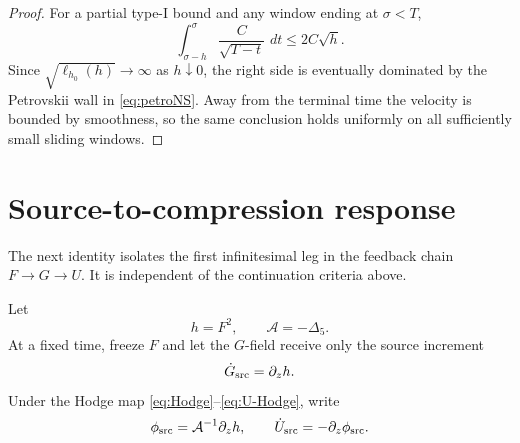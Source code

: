 \documentclass[11pt]{article}
\numberwithin{equation}{section}
\theoremstyle{definition}
\newcommand{\dd}{\,d}
\newcommand{\lapfive}{\Delta_5}
\begin{document}
\begin{proof}
For a partial type-I bound and any window ending at $\sigma<T$,
\[
 \int_{\sigma-h}^{\sigma}\frac{C}{\sqrt{T-t}}\,\dd t
 \le2C\sqrt h.
\]
Since $\sqrt{\ell_{h_0}(h)}\to\infty$ as $h\downarrow0$, the right side is eventually dominated by the Petrovskii wall in \eqref{eq:petroNS}.  Away from the terminal time the velocity is bounded by smoothness, so the same conclusion holds uniformly on all sufficiently small sliding windows.
\end{proof}

\section{Source-to-compression response}

The next identity isolates the first infinitesimal leg in the feedback chain $F\to G\to U$.  It is independent of the continuation criteria above.

Let
\[
 h=F^2,
 \qquad
 \mathcal A=-\lapfive.
\]
At a fixed time, freeze $F$ and let the $G$-field receive only the source increment
\begin{equation}\label{eq:dGsrc}
 \dot G_{\rm src}=\partial_z h.
\end{equation}
Under the Hodge map \eqref{eq:Hodge}--\eqref{eq:U-Hodge}, write
\begin{equation}\label{eq:phi-src}
 \phi_{\rm src}=\mathcal A^{-1}\partial_z h,
 \qquad
 \dot U_{\rm src}=-\partial_z\phi_{\rm src}.
\end{equation}
\end{document}
